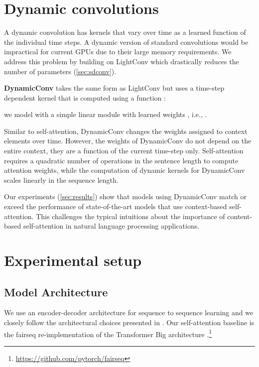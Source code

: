 \documentclass{article} \usepackage{iclr2019_conference,times}
\newcommand{\newterm}[1]{{\bf #1}}
\def\sdconv{LightConv}
\def\tvsdconv{DynamicConv}
\begin{document}
\section{Dynamic convolutions}\label{sec:tvsdconv}

A dynamic convolution has kernels that vary over time as a learned function of the individual time steps.
A dynamic version of standard convolutions would be impractical for current GPUs due to their large memory requirements.
We address this problem by building on \sdconv{} which drastically reduces the number of parameters (\textsection\ref{sec:sdconv}). 

\newterm{\tvsdconv{}} takes the same form as \sdconv{} but uses a time-step dependent kernel that is computed using a function :

we model  with a simple linear module with learned weights , i.e.,
. 

Similar to self-attention, \tvsdconv{} changes the weights assigned to context elements over time.
However, the weights of \tvsdconv{} do not depend on the entire context, they are a function of the current time-step only.
Self-attention requires a quadratic number of operations in the sentence length to compute attention weights, while the computation of dynamic kernels for \tvsdconv{} scales linearly in the sequence length. 

Our experiments (\textsection\ref{sec:results}) show that models using \tvsdconv{} match or exceed the performance of state-of-the-art models that use context-based self-attention. 
This challenges the typical intuitions about the importance of content-based self-attention in natural language processing applications.

 

\section{Experimental setup}\label{sec:setup}

\subsection{Model Architecture}\label{sec:architecture}

We use an encoder-decoder architecture for sequence to sequence learning \citep{sutskever2014sequence} and we closely follow the architectural choices presented in \citet{vaswani2017transformer}.
Our self-attention baseline is the fairseq re-implementation of the Transformer Big architecture  \citep{ott2018scaling}.\footnote{\url{https://github.com/pytorch/fairseq}}
\end{document}
